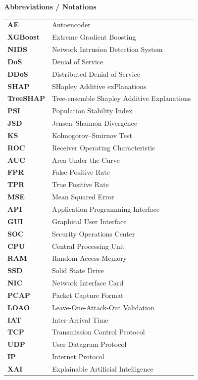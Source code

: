 \documentclass[12pt,a4paper]{report}
\begin{document}
\clearpage
{}
\setcounter{page}{9}
\thispagestyle{plain}

\begin{center}
{\Large\bfseries Abbreviations / Notations}\\[0.6cm]
\end{center}

\noindent
\begin{tabularx}{\textwidth}{p{3.2cm} X}
\textbf{AE} & Autoencoder \\
\textbf{XGBoost} & Extreme Gradient Boosting \\
\textbf{NIDS} & Network Intrusion Detection System \\
\textbf{DoS} & Denial of Service \\
\textbf{DDoS} & Distributed Denial of Service \\
\textbf{SHAP} & SHapley Additive exPlanations \\
\textbf{TreeSHAP} & Tree-ensemble Shapley Additive Explanations \\
\textbf{PSI} & Population Stability Index \\
\textbf{JSD} & Jensen--Shannon Divergence \\
\textbf{KS} & Kolmogorov--Smirnov Test \\
\textbf{ROC} & Receiver Operating Characteristic \\
\textbf{AUC} & Area Under the Curve \\
\textbf{FPR} & False Positive Rate \\
\textbf{TPR} & True Positive Rate \\
\textbf{MSE} & Mean Squared Error \\
\textbf{API} & Application Programming Interface \\
\textbf{GUI} & Graphical User Interface \\
\textbf{SOC} & Security Operations Center \\
\textbf{CPU} & Central Processing Unit \\
\textbf{RAM} & Random Access Memory \\
\textbf{SSD} & Solid State Drive \\
\textbf{NIC} & Network Interface Card \\
\textbf{PCAP} & Packet Capture Format \\
\textbf{LOAO} & Leave-One-Attack-Out Validation \\
\textbf{IAT} & Inter-Arrival Time \\
\textbf{TCP} & Transmission Control Protocol \\
\textbf{UDP} & User Datagram Protocol \\
\textbf{IP} & Internet Protocol \\
\textbf{XAI} & Explainable Artificial Intelligence \\
\end{tabularx}
\end{document}
